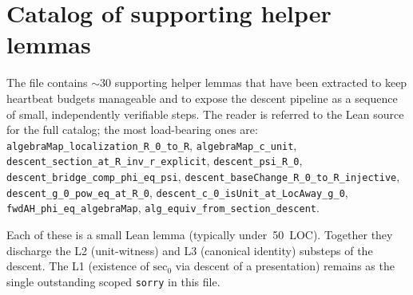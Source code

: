 \section{Catalog of supporting helper lemmas}

The file contains $\sim 30$ supporting helper lemmas that have been extracted
to keep heartbeat budgets manageable and to expose the descent pipeline as a
sequence of small, independently verifiable steps. The reader is referred to
the Lean source for the full catalog; the most load-bearing ones are:
\texttt{algebraMap\_localization\_R\_0\_to\_R}, \texttt{algebraMap\_c\_unit},
\texttt{descent\_section\_at\_R\_inv\_r\_explicit}, \texttt{descent\_psi\_R\_0},
\texttt{descent\_bridge\_comp\_phi\_eq\_psi},
\texttt{descent\_baseChange\_R\_0\_to\_R\_injective},
\texttt{descent\_g\_0\_pow\_eq\_at\_R\_0},
\texttt{descent\_c\_0\_isUnit\_at\_LocAway\_g\_0},
\texttt{fwdAH\_phi\_eq\_algebraMap},
\texttt{alg\_equiv\_from\_section\_descent}.

Each of these is a small Lean lemma (typically under~50~LOC). Together they
discharge the L2 (unit-witness) and L3 (canonical identity) substeps of the
descent. The L1 (existence of $\mathrm{sec}_0$ via descent of a presentation)
remains as the single outstanding scoped \texttt{sorry} in this file.
